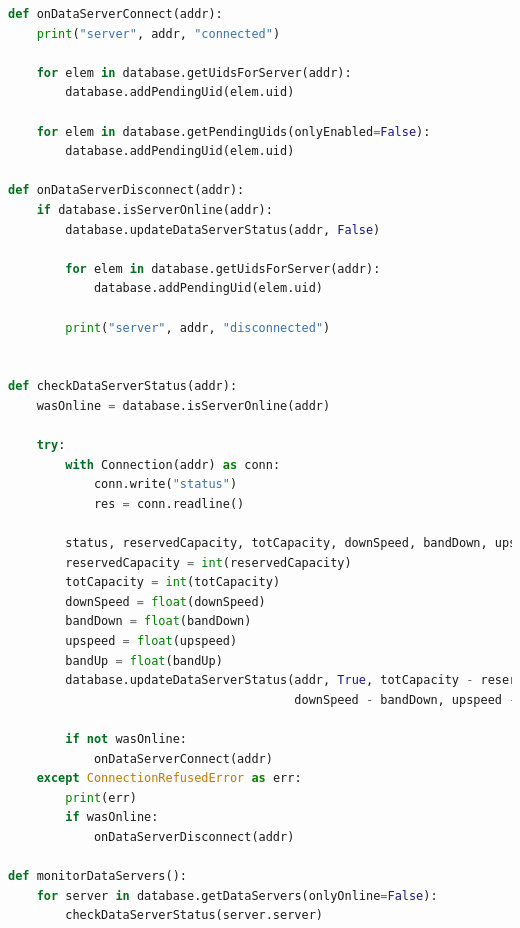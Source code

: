 \documentclass[11pt,a4paper,english]{article}
\begin{document}
\begin{lstlisting}[language=Python, title=Controllo dello stato dei dataserver]
def onDataServerConnect(addr):
    print("server", addr, "connected")

    for elem in database.getUidsForServer(addr):
        database.addPendingUid(elem.uid)

    for elem in database.getPendingUids(onlyEnabled=False):
        database.addPendingUid(elem.uid)

def onDataServerDisconnect(addr):
    if database.isServerOnline(addr):
        database.updateDataServerStatus(addr, False)

        for elem in database.getUidsForServer(addr):
            database.addPendingUid(elem.uid)

        print("server", addr, "disconnected")


def checkDataServerStatus(addr):
    wasOnline = database.isServerOnline(addr)
    
    try:
        with Connection(addr) as conn:
            conn.write("status")
            res = conn.readline()

        status, reservedCapacity, totCapacity, downSpeed, bandDown, upspeed, bandUp = res
        reservedCapacity = int(reservedCapacity)
        totCapacity = int(totCapacity)
        downSpeed = float(downSpeed)
        bandDown = float(bandDown)
        upspeed = float(upspeed)
        bandUp = float(bandUp)
        database.updateDataServerStatus(addr, True, totCapacity - reservedCapacity, totCapacity,
                                        downSpeed - bandDown, upspeed - bandUp)

        if not wasOnline:
            onDataServerConnect(addr)
    except ConnectionRefusedError as err:
        print(err)
        if wasOnline:
            onDataServerDisconnect(addr)

def monitorDataServers():
    for server in database.getDataServers(onlyOnline=False):
        checkDataServerStatus(server.server)
\end{lstlisting}
\end{document}

